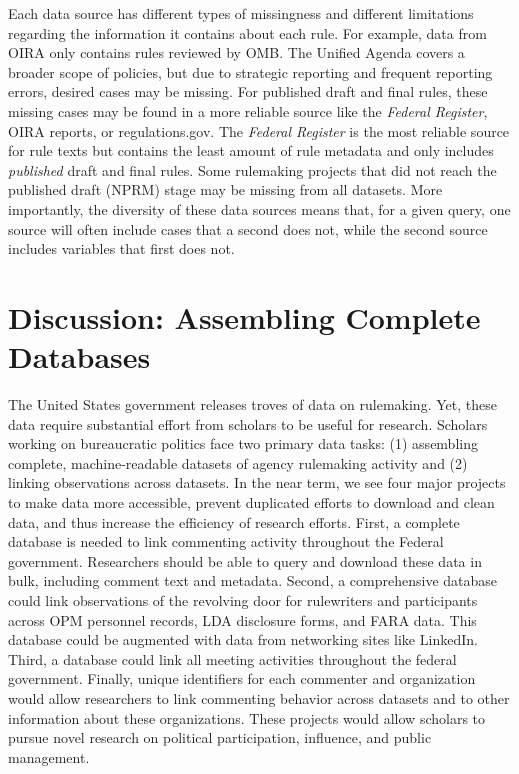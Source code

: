 \documentclass[
      12pt,
        ]{article}
\begin{document}
Each data source has different types of missingness and different
limitations regarding the information it contains about each rule. For
example, data from OIRA only contains rules reviewed by OMB. The Unified
Agenda covers a broader scope of policies, but due to strategic
reporting and frequent reporting errors, desired cases may be missing.
For published draft and final rules, these missing cases may be found in
a more reliable source like the \emph{Federal Register}, OIRA reports,
or regulations.gov. The \emph{Federal Register} is the most reliable
source for rule texts but contains the least amount of rule metadata and
only includes \emph{published} draft and final rules. Some rulemaking
projects that did not reach the published draft (NPRM) stage may be
missing from all datasets. More importantly, the diversity of these data
sources means that, for a given query, one source will often include
cases that a second does not, while the second source includes variables
that first does not.

\hypertarget{discussion-assembling-complete-databases}{%
\section{Discussion: Assembling Complete
Databases}\label{discussion-assembling-complete-databases}}

The United States government releases troves of data on rulemaking. Yet,
these data require substantial effort from scholars to be useful for
research. Scholars working on bureaucratic politics face two primary
data tasks: (1) assembling complete, machine-readable datasets of agency
rulemaking activity and (2) linking observations across datasets. In the
near term, we see four major projects to make data more accessible,
prevent duplicated efforts to download and clean data, and thus increase
the efficiency of research efforts. First, a complete database is needed
to link commenting activity throughout the Federal government.
Researchers should be able to query and download these data in bulk,
including comment text and metadata. Second, a comprehensive database
could link observations of the revolving door for rulewriters and
participants across OPM personnel records, LDA disclosure forms, and
FARA data. This database could be augmented with data from networking
sites like LinkedIn. Third, a database could link all meeting activities
throughout the federal government. Finally, unique identifiers for each
commenter and organization would allow researchers to link commenting
behavior across datasets and to other information about these
organizations. These projects would allow scholars to pursue novel
research on political participation, influence, and public management.
\end{document}
